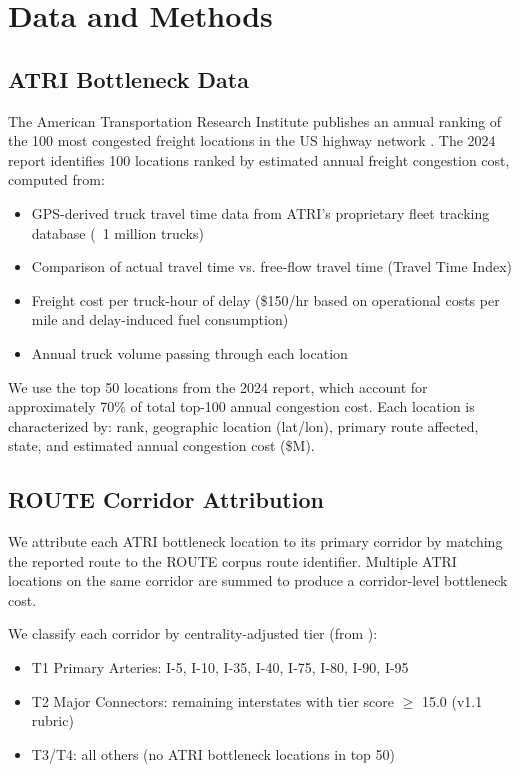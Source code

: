 \section{Data and Methods}

\subsection{ATRI Bottleneck Data}

The American Transportation Research Institute publishes an annual ranking of the 100 most congested freight locations in the US highway network \citep{ATRI2024}. The 2024 report identifies 100 locations ranked by estimated annual freight congestion cost, computed from:

\begin{itemize}
\item GPS-derived truck travel time data from ATRI's proprietary fleet tracking database (~1 million trucks)
\item Comparison of actual travel time vs. free-flow travel time (Travel Time Index)
\item Freight cost per truck-hour of delay (\$150/hr based on operational costs per mile and delay-induced fuel consumption)
\item Annual truck volume passing through each location
\end{itemize}

We use the top 50 locations from the 2024 report, which account for approximately 70\% of total top-100 annual congestion cost. Each location is characterized by: rank, geographic location (lat/lon), primary route affected, state, and estimated annual congestion cost (\$M).

\subsection{ROUTE Corridor Attribution}

We attribute each ATRI bottleneck location to its primary corridor by matching the reported route to the ROUTE corpus route identifier. Multiple ATRI locations on the same corridor are summed to produce a corridor-level bottleneck cost.

We classify each corridor by centrality-adjusted tier (from \citet{ROUTE_A1}):
\begin{itemize}
\item T1 Primary Arteries: I-5, I-10, I-35, I-40, I-75, I-80, I-90, I-95
\item T2 Major Connectors: remaining interstates with tier score $\geq$ 15.0 (v1.1 rubric)
\item T3/T4: all others (no ATRI bottleneck locations in top 50)
\end{itemize}

